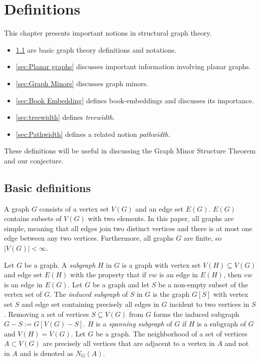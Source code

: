 \chapter{Definitions}\label{chap:Definitions}
This chapter presents important notions in structural graph theory.
\begin{itemize}
	\item \cref{sec: Basic definitions} are basic graph theory definitions and notations.
	\item \cref{sec:Planar graphs} discusses important information involving planar graphs.
	\item \cref{sec:Graph Minors} discusses graph minors.
	\item \cref{sec:Book Embedding} defines book-embeddings and discusses its importance.
	\item \cref{sec:treewidth} defines \textit{treewidth}.
	\item \cref{sec:Pathwidth} defines a related notion \textit{pathwidth}.
\end{itemize}
These definitions will be useful in discussing the Graph Minor Structure Theorem and our conjecture.
\section{Basic definitions}\label{sec: Basic definitions}
A graph $G$ consists of a vertex set $V(G)$ and an edge set $E(G)$. $E(G)$ contains subsets of $V(G)$ with two elements. In this paper, all graphs are simple, meaning that all edges join two distinct vertices and there is at most one edge between any two vertices. Furthermore, all graphs $G$ are finite, so $|V(G)| < \infty$. 

Let $G$ be a graph. A \textit{subgraph} $H$ in $G$ is a graph with vertex set $V(H) \subseteq V(G)$ and edge set $E(H)$ with the property that if $vw$ is an edge in $E(H)$, then $vw$ is an edge in $E(G)$.
Let $G$ be a graph and let $S$ be a non-empty subset of the vertex set of $G$. The \textit{induced subgraph} of $S$ in $G$ is the graph $G[S]$ with vertex set $S$ and edge set containing precisely all edges in $G$ incident to two vertices in $S$. Removing a set of vertices $S \subseteq V(G)$ from $G$ forms the induced subgraph $G - S := G[V(G) - S]$. 
$H$ is a \textit{spanning subgraph} of $G$ if $H$ is a subgraph of $G$ and $V(H) = V(G)$. 
Let $G$ be a graph. The neighborhood of a set of vertices $A \subset V(G)$ are precisely all vertices that are adjacent to a vertex in $A$ and not in $A$ and is denoted as $N_G(A)$. 

